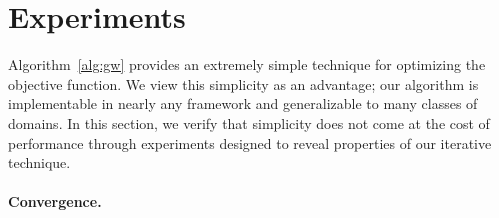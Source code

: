 
\section{Experiments}\label{sec:experiments}

Algorithm~\ref{alg:gw} provides an extremely simple technique for optimizing the \GWa objective function.  We view this simplicity as an advantage; our algorithm is implementable in nearly any framework and generalizable to many classes of domains.  In this section, we verify that simplicity does not come at the cost of performance through experiments designed to reveal properties of our iterative technique.

\paragraph*{Convergence.}

